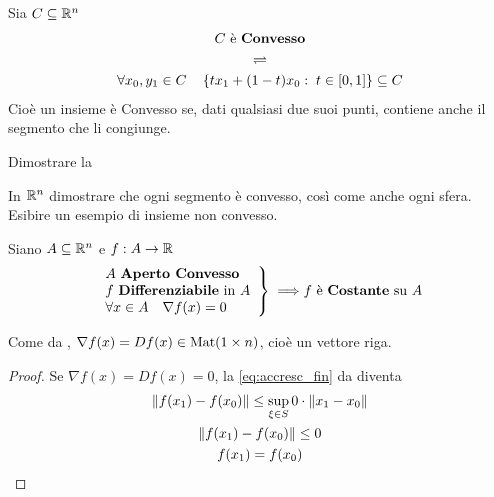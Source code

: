 \begin{definition}
	\label{def:convesso}
	Sia $C \subseteq \mathbb{R}^n$
	\begin{equation*}
		\begin{gathered}
			C \text{ è \textbf{Convesso}}\\
			\rightleftharpoons\\
			\forall x_0,y_1 \in C \quad \left\{tx_1+(1-t)x_0:\; t \in \left[0,1\right]\right\} \subseteq C
		\end{gathered}
	\end{equation*}
	Cioè un insieme è Convesso se, dati qualsiasi due suoi punti, contiene anche il segmento che li congiunge.
\end{definition}
\begin{exercise}
	Dimostrare la 
\end{exercise}
\begin{exercise}
	In $\mathbb{R}^n$ dimostrare che ogni segmento è convesso, così come anche ogni sfera.\\
	Esibire un esempio di insieme non convesso.
\end{exercise}
\begin{corollary}
	\label{coro:convess_nabla_0_f_const}
	Siano $A \subseteq \mathbb{R}^n$ e $f: A \to \mathbb{R}$
	\[
		\left.
			\begin{array}{l}
				A \text{ \textbf{Aperto Convesso}}\\
				f \text{ \textbf{Differenziabile} in } A\\
				\forall x \in A \quad \nabla f(x) = 0
			\end{array}
		\right\}
		\implies\\
		f \text{ è \textbf{Costante} su } A
	\]
	\vspace*{-\baselineskip}
	\begin{note}
		Come da , $\nabla f(x) = Df(x) \in \operatorname{Mat} (1 \times n)$, cioè un vettore riga.
	\end{note}
	\begin{proof}
		Se $\nabla f(x) = Df(x) = 0$, la \cref{eq:accresc_fin} da  diventa
		\begin{equation*}
			\begin{gathered}
				\left\|f(x_1) - f(x_0)\right\| \leq \sup\limits_{\xi \in S} 0 \cdot \left\|x_1-x_0\right\|\\
				\left\|f(x_1) - f(x_0)\right\| \leq 0\\
				f(x_1) = f(x_0)
			\end{gathered}
		\end{equation*}
	\end{proof}
\end{corollary}

